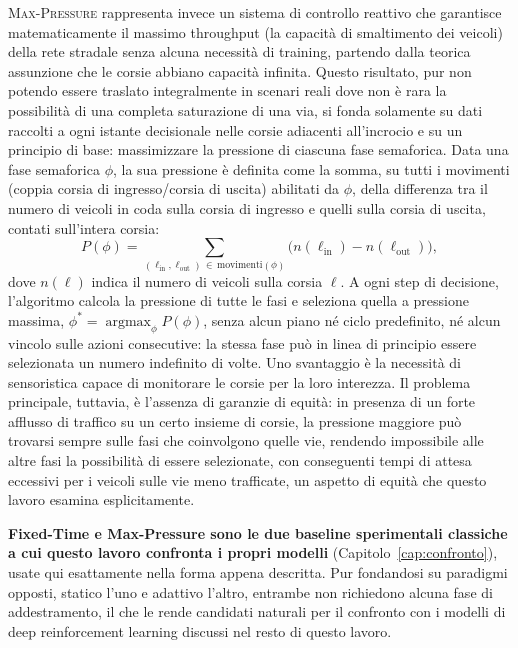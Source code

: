 \textsc{Max-Pressure} \citep{varaiya2013maxpressure} rappresenta invece
un sistema di controllo reattivo che garantisce matematicamente il
massimo throughput (la capacità di smaltimento dei veicoli) della rete
stradale senza alcuna necessità di training, partendo dalla teorica
assunzione che le corsie abbiano capacità infinita. Questo risultato, pur
non potendo essere traslato integralmente in scenari reali dove non è
rara la possibilità di una completa saturazione di una via, si fonda
solamente su dati raccolti a ogni istante decisionale nelle corsie
adiacenti all'incrocio e su un principio di base: massimizzare la
pressione di ciascuna fase semaforica. Data una fase semaforica $\phi$,
la sua pressione è definita come la somma, su tutti i movimenti (coppia
corsia di ingresso/corsia di uscita) abilitati da $\phi$, della
differenza tra il numero di veicoli in coda sulla corsia di ingresso e
quelli sulla corsia di uscita, contati sull'intera corsia:
\begin{equation}
  P(\phi) = \sum_{(\ell_{\mathrm{in}}, \ell_{\mathrm{out}}) \,\in\, \mathrm{movimenti}(\phi)} \big(n(\ell_{\mathrm{in}}) - n(\ell_{\mathrm{out}})\big),
  \label{eq:maxpressure-phase}
\end{equation}
dove $n(\ell)$ indica il numero di veicoli sulla corsia $\ell$. A ogni
step di decisione, l'algoritmo calcola la pressione di tutte le fasi e
seleziona quella a pressione massima, $\phi^* =
  \operatorname*{argmax}_\phi P(\phi)$, senza alcun piano né ciclo
predefinito, né alcun vincolo sulle azioni consecutive: la stessa fase
può in linea di principio essere selezionata un numero indefinito di
volte. Uno svantaggio è la necessità di sensoristica capace di monitorare
le corsie per la loro interezza. Il problema principale, tuttavia, è
l'assenza di garanzie di equità: in presenza di un forte afflusso di
traffico su un certo insieme di corsie, la pressione maggiore può
trovarsi sempre sulle fasi che coinvolgono quelle vie, rendendo
impossibile alle altre fasi la possibilità di essere selezionate, con
conseguenti tempi di attesa eccessivi per i veicoli sulle vie meno
trafficate, un aspetto di equità che questo lavoro esamina esplicitamente.

\textbf{Fixed-Time e Max-Pressure sono le due baseline sperimentali
  classiche a cui questo lavoro confronta i propri modelli}
(Capitolo~\ref{cap:confronto}), usate qui esattamente nella forma appena
descritta. Pur fondandosi su paradigmi opposti, statico l'uno e adattivo
l'altro, entrambe non richiedono alcuna fase di addestramento, il che le
rende candidati naturali per il confronto con i modelli di deep
reinforcement learning discussi nel resto di questo lavoro.


